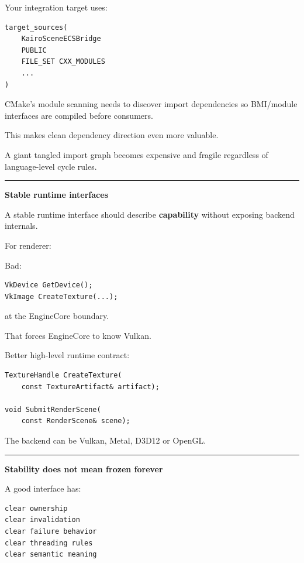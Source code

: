 Your integration target uses:

\begin{verbatim}
target_sources(
    KairoSceneECSBridge
    PUBLIC
    FILE_SET CXX_MODULES
    ...
)
\end{verbatim}

CMake's module scanning needs to discover import dependencies so BMI/module interfaces are compiled before consumers.

This makes clean dependency direction even more valuable.

A giant tangled import graph becomes expensive and fragile regardless of language-level cycle rules.

\begin{center}\rule{0.5\linewidth}{0.5pt}\end{center}

\textbf{Stable runtime interfaces}

A stable runtime interface should describe \textbf{capability} without exposing backend internals.

For renderer:

Bad:

\begin{verbatim}
VkDevice GetDevice();
VkImage CreateTexture(...);
\end{verbatim}

at the EngineCore boundary.

That forces EngineCore to know Vulkan.

Better high-level runtime contract:

\begin{verbatim}
TextureHandle CreateTexture(
    const TextureArtifact& artifact);

void SubmitRenderScene(
    const RenderScene& scene);
\end{verbatim}

The backend can be Vulkan, Metal, D3D12 or OpenGL.

\begin{center}\rule{0.5\linewidth}{0.5pt}\end{center}

\textbf{Stability does not mean frozen forever}

A good interface has:

\begin{verbatim}
clear ownership
clear invalidation
clear failure behavior
clear threading rules
clear semantic meaning
\end{verbatim}

